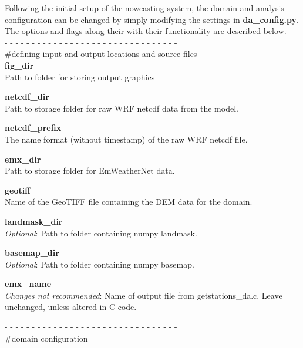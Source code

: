 \documentclass{article}
\begin{document}
Following the initial setup of the nowcasting system, the domain and analysis configuration can be changed by simply modifying the settings in \textbf{da\_config.py}. The options and flags along their with their functionality are described below. \\

\noindent- - - - - - - - - - - - - - - - - - - - - - - - - - - - - - - -\\
\noindent\#defining input and output locations and source files\\

\noindent \textbf{fig\_dir}\\
Path to folder for storing output graphics

\vspace{0.1cm}
\noindent \textbf{netcdf\_dir}\\
Path to storage folder for raw WRF netcdf data from the model. 

\vspace{0.1cm}
\noindent \textbf{netcdf\_prefix}\\
The name format (without timestamp) of the raw WRF netcdf file. 

\vspace{0.1cm}
\noindent \textbf{emx\_dir}\\
Path to storage folder for EmWeatherNet data. 

\vspace{0.1cm}
\noindent \textbf{geotiff}\\
Name of the GeoTIFF file containing the DEM data for the domain.  

\vspace{0.1cm}
\noindent \textbf{landmask\_dir}\\
\emph{Optional}: Path to folder containing numpy landmask. 

\vspace{0.1cm}
\noindent \textbf{basemap\_dir}\\
\emph{Optional}: Path to folder containing numpy basemap. 

\vspace{0.1cm}
\noindent \textbf{emx\_name}\\
\emph{Changes not recommended}: Name of output file from getstations\_da.c. Leave unchanged, unless altered in C code. 

\vspace{0.5cm}
\noindent- - - - - - - - - - - - - - - - - - - - - - - - - - - - - - - -\\
\noindent\#domain configuration\\
\end{document}
